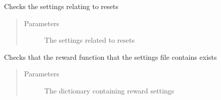 \documentclass[letterpaper,10pt,english]{sphinxmanual}
\begin{document}
\begin{fulllineitems}
\label{\detokenize{source/yawning_titan.envs.generic.helpers:yawning_titan.envs.generic.helpers.environment_input_validation.check_reset}}
\sphinxAtStartPar
Checks the settings relating to resets
\begin{quote}\begin{description}
\item[{Parameters}] \leavevmode
\sphinxAtStartPar
{} \textendash{} The settings related to resets

\end{description}\end{quote}

\end{fulllineitems}


\begin{fulllineitems}
\label{\detokenize{source/yawning_titan.envs.generic.helpers:yawning_titan.envs.generic.helpers.environment_input_validation.check_reward_function_exists}}
\sphinxAtStartPar
Checks that the reward function that the settings file contains exists
\begin{quote}\begin{description}
\item[{Parameters}] \leavevmode
\sphinxAtStartPar
{} \textendash{} The dictionary containing reward settings

\end{description}\end{quote}

\end{fulllineitems}

\end{document}
